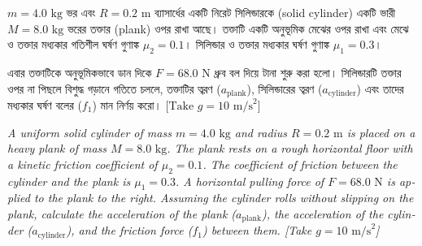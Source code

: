 \documentclass[12pt, a4paper]{article}
\begin{document}
\begin{tcolorbox}[questionbox={প্রশ্ন (Question)13}]
\noindent
$m = 4.0\text{ kg}$ ভর এবং $R = 0.2\text{ m}$ ব্যাসার্ধের একটি নিরেট সিলিন্ডারকে (solid cylinder) একটি ভারী $M = 8.0\text{ kg}$ ভরের তক্তার (plank) ওপর রাখা আছে। তক্তাটি একটি অনুভূমিক মেঝের ওপর রাখা এবং মেঝে ও তক্তার মধ্যকার গতিশীল ঘর্ষণ গুণাঙ্ক $\mu_2 = 0.1$। সিলিন্ডার ও তক্তার মধ্যকার ঘর্ষণ গুণাঙ্ক $\mu_1 = 0.3$। 

\vspace{0.3em}
\noindent
এবার তক্তাটিকে অনুভূমিকভাবে ডান দিকে $F = 68.0\text{ N}$ ধ্রুব বল দিয়ে টানা শুরু করা হলো। সিলিন্ডারটি তক্তার ওপর না পিছলে বিশুদ্ধ গড়ানে গতিতে চললে, তক্তাটির ত্বরণ ($a_{\text{plank}}$), সিলিন্ডারের ত্বরণ ($a_{\text{cylinder}}$) এবং তাদের মধ্যকার ঘর্ষণ বলের ($f_1$) মান নির্ণয় করো। [$\text{Take } g = 10\text{ m/s}^2$]

\vspace{0.8em}
\begin{english}
\noindent\textit{\color{darkgray}
A uniform solid cylinder of mass $m = 4.0\text{ kg}$ and radius $R = 0.2\text{ m}$ is placed on a heavy plank of mass $M = 8.0\text{ kg}$. The plank rests on a rough horizontal floor with a kinetic friction coefficient of $\mu_2 = 0.1$. The coefficient of friction between the cylinder and the plank is $\mu_1 = 0.3$. A horizontal pulling force of $F = 68.0\text{ N}$ is applied to the plank to the right. Assuming the cylinder rolls without slipping on the plank, calculate the acceleration of the plank ($a_{\text{plank}}$), the acceleration of the cylinder ($a_{\text{cylinder}}$), and the friction force ($f_1$) between them. [Take $g = 10\text{ m/s}^2$]
}
\end{english}
\end{tcolorbox}
\end{document}
